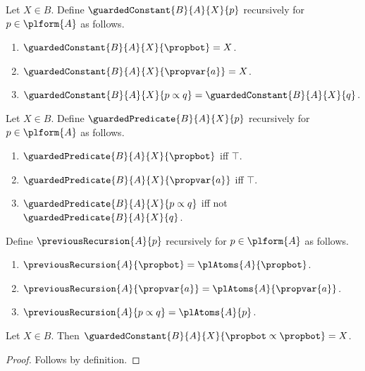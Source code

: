 

\begin{recursive-definition}\label{guarded_constant}
    Let $X\in B$.
    Define $\guardedConstant{B}{A}{X}{p}$ recursively for $p\in\plform{A}$ as follows.
    \begin{enumerate}
        \item[Falsity] $\guardedConstant{B}{A}{X}{\propbot}=X$.
        \item[Atom] $\guardedConstant{B}{A}{X}{\propvar{a}}=X$.
        \item[Implication] $\guardedConstant{B}{A}{X}{p\propto q}=\guardedConstant{B}{A}{X}{q}$.
    \end{enumerate}
\end{recursive-definition}

\begin{recursive-definition}\label{guarded_predicate}
    Let $X\in B$.
    Define $\guardedPredicate{B}{A}{X}{p}$ recursively for $p\in\plform{A}$ as follows.
    \begin{enumerate}
        \item[Falsity] $\guardedPredicate{B}{A}{X}{\propbot}$ iff $\top$.
        \item[Atom] $\guardedPredicate{B}{A}{X}{\propvar{a}}$ iff $\top$.
        \item[Implication] $\guardedPredicate{B}{A}{X}{p\propto q}$ iff not $\guardedPredicate{B}{A}{X}{q}$.
    \end{enumerate}
\end{recursive-definition}

\begin{recursive-definition}\label{previous_recursion}
    Define $\previousRecursion{A}{p}$ recursively for $p\in\plform{A}$ as follows.
    \begin{enumerate}
        \item[Falsity] $\previousRecursion{A}{\propbot}=\plAtoms{A}{\propbot}$.
        \item[Atom] $\previousRecursion{A}{\propvar{a}}=\plAtoms{A}{\propvar{a}}$.
        \item[Implication] $\previousRecursion{A}{p\propto q}=\plAtoms{A}{p}$.
    \end{enumerate}
\end{recursive-definition}

\begin{proposition}\label{guarded_constant_use}
    Let $X\in B$.
    Then $\guardedConstant{B}{A}{X}{\propbot\propto\propbot}=X$.
\end{proposition}
\begin{proof}
    Follows by definition.
\end{proof}

